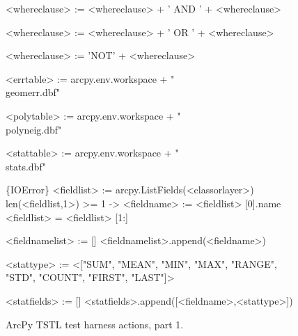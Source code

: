 \begin{figure}
{\begin{code}
<whereclause> := <whereclause> + ' AND ' + <whereclause>

<whereclause> := <whereclause> + ' OR ' +  <whereclause>

<whereclause> := 'NOT' + <whereclause>

<errtable> := arcpy.env.workspace + "\\geomerr.dbf"

<polytable> := arcpy.env.workspace + "\\polyneig.dbf"

<stattable> := arcpy.env.workspace + "\\stats.dbf"

\{IOError\} <fieldlist> := arcpy.ListFields(<classorlayer>)
len(<fieldlist,1>) >= 1 -> <fieldname> := <fieldlist> [0].name
<fieldlist> = <fieldlist> [1:]

<fieldnamelist> := []
<fieldnamelist>.append(<fieldname>)

<stattype> := <["SUM", "MEAN", "MIN", "MAX", "RANGE", "STD", "COUNT", "FIRST", "LAST"]>

<statfields> := []
<statfields>.append([<fieldname>,<stattype>])
\end{code}
}
\caption{ArcPy TSTL test harness actions, part 1.}
\label{actions1}
\end{figure}

